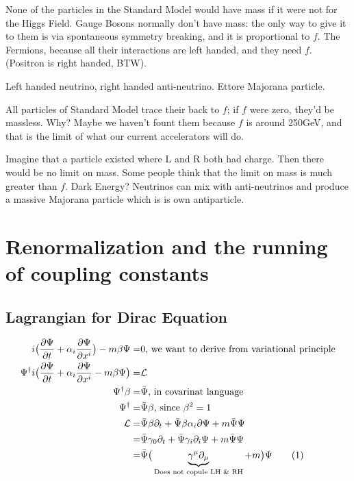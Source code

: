 \documentclass[]{article}
\newcommand\numberthis{\addtocounter{equation}{1}\tag{\theequation}}
\begin{document}
None of the particles in the Standard Model would have mass if it were not for the Higgs Field. Gauge Bosons normally don't have mass: the only way to give it to them is via spontaneous symmetry breaking, and it is proportional to $f$. The Fermions, because all their interactions are left handed, and they need $f$.(Positron is right handed, BTW).

Left handed neutrino, right handed anti-neutrino. Ettore Majorana particle.

All particles of Standard Model trace their back to $f$; if $f$ were zero, they'd be massless. Why? Maybe we haven't fount them because $f$ is around 250GeV, and that is the limit of what our current accelerators will do.

Imagine that a particle existed where L and R both had charge. Then there would be no limit on mass. Some people think that the limit on mass is much greater than $f$. Dark Energy?
Neutrinos can mix with anti-neutrinos and produce a massive Majorana particle which is is own antiparticle.

\section{Renormalization and the running of coupling constants}

\subsection{Lagrangian for Dirac Equation}

 \begin{align*}
	i \big(\frac{\partial \Psi}{\partial t} + \alpha_i \frac{\partial \Psi}{\partial 	x^i}\big) -m \beta \Psi =&0 \text{, we want to derive from variational principle}\\
	\Psi^\dagger i \big(\frac{\partial \Psi}{\partial t} + \alpha_i \frac{\partial \Psi}{\partial 	x^i} -m \beta \Psi\big) =& \mathcal{L}\\
	\Psi^\dagger \beta =& \bar{\Psi} \text{, in covarinat language}\\
	\Psi^\dagger  = &\bar{\Psi} \beta \text{, since $\beta^2=1$}\\
	\mathcal{L} =& \bar{\Psi}\beta \partial_t + \bar{\Psi}\beta \alpha_i \partial \Psi +m \bar{\Psi}  \Psi\\
	=& \bar{\Psi}\gamma_0 \partial_t + \bar{\Psi}\gamma_i \partial_i \Psi +m \bar{\Psi}  \Psi\\
	=& \bar{\Psi}\big(\underbrace{\gamma^\mu \partial_\mu}_\text{Does not copule LH \& RH} +m  \big) \Psi \numberthis \label{eq:dirac:lagrange}
\end{align*}
\end{document}
